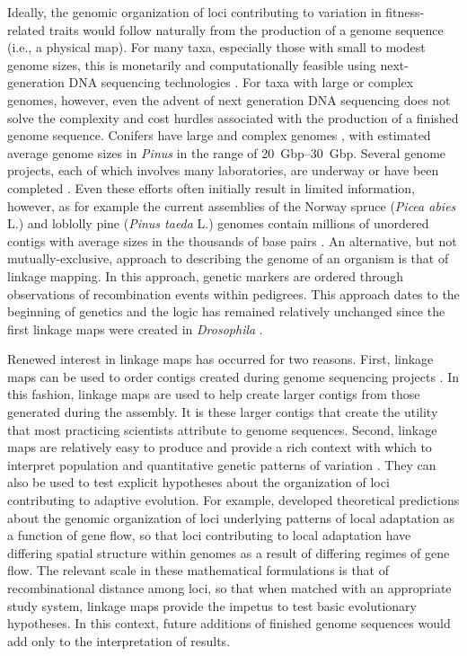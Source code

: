 \documentclass[smallextended]{svjour3}
\begin{document}
Ideally, the genomic organization of loci contributing to variation in
fitness-related traits would follow naturally from the production of a genome
sequence (i.e., a physical map). For many taxa, especially those with small to
modest genome sizes, this is monetarily and computationally feasible using
next-generation DNA sequencing technologies \citep{Koboldt:2013}. For taxa with
large or complex genomes, however, even the advent of next generation DNA
sequencing does not solve the complexity and cost hurdles associated with the
production of a finished genome sequence. Conifers have large and complex
genomes \citep{Murray:1998, Ahuja:2005}, with estimated average genome sizes in
\textit{Pinus} in the range of \SIrange{20}{30}{Gbp}. Several genome projects,
each of which involves many laboratories, are underway or have been completed
\citep{Mackay:2012}. Even these efforts often initially result in limited
information, however, as for example the current assemblies of the Norway spruce
(\textit{Picea abies} L.) and loblolly pine (\textit{Pinus taeda} L.) genomes
contain millions of unordered contigs with average sizes in the thousands of
base pairs \citep{Nystedt:2013, Neale:2014}. An alternative, but not
mutually-exclusive, approach to describing the genome of an organism is that of
linkage mapping. In this approach, genetic markers are ordered through
observations of recombination events within pedigrees. This approach dates to
the beginning of genetics and the logic has remained relatively unchanged since
the first linkage maps were created in \textit{Drosophila}
\citep{Sturtevant:1913}.

Renewed interest in linkage maps has occurred for two reasons. First, linkage
maps can be used to order contigs created during genome sequencing projects
\citep{Mackay:2012, Martinez-Garcia:2013}. In this fashion, linkage maps are
used to help create larger contigs from those generated during the assembly. It
is these larger contigs that create the utility that most practicing scientists
attribute to genome sequences. Second, linkage maps are relatively easy to
produce and provide a rich context with which to interpret population and
quantitative genetic patterns of variation \citep[e.g.,][]{Eckert:2010a,
  Eckert:2010b, Eckert:2013a, Yeaman:2013}. They can also be used to test
explicit hypotheses about the organization of loci contributing to adaptive
evolution. For example, \citet{Yeaman:2011} developed theoretical predictions
about the genomic organization of loci underlying patterns of local adaptation
as a function of gene flow, so that loci contributing to local adaptation have
differing spatial structure within genomes as a result of differing regimes of
gene flow. The relevant scale \citep[\textit{sensu}][]{Houle:2011} in these
mathematical formulations is that of recombinational distance among loci, so
that when matched with an appropriate study system, linkage maps provide the
impetus to test basic evolutionary hypotheses. In this context, future additions
of finished genome sequences would add only to the interpretation of results.
\end{document}
